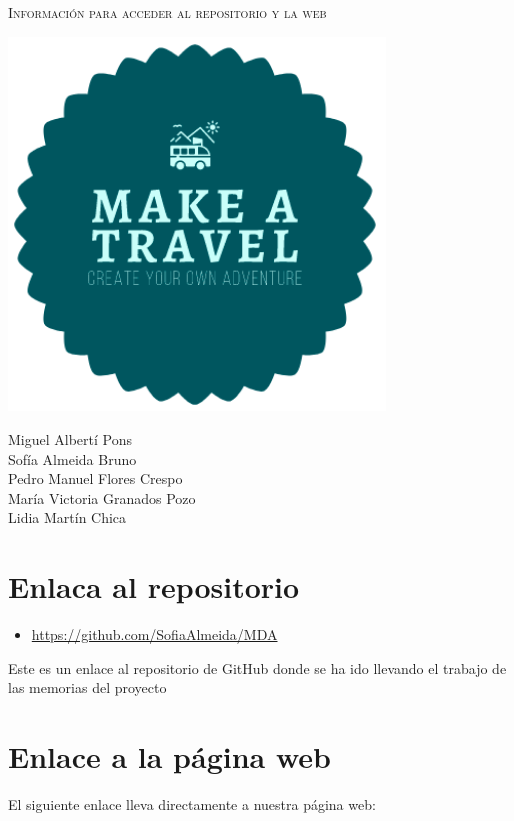 \documentclass[11pt]{article}
\begin{document}
\begin{titlepage}
\centering
\vspace{4.5cm}
{\scshape\LARGE Información para acceder al repositorio y la web \par}
\vspace{1.5cm}

\includegraphics[width=10cm]{Logo}

\vspace{3cm}
{\scshape\large \par}
\vspace{0.5cm}

{Miguel Albertí Pons\\
Sofía Almeida Bruno\\
Pedro Manuel Flores Crespo\\
María Victoria Granados Pozo\\
Lidia Martín Chica
\par}

\end{titlepage}
\newpage

\section{Enlaca al repositorio}
\begin{itemize}
\item \url{https://github.com/SofiaAlmeida/MDA} 
\end{itemize}

Este es un enlace al repositorio de GitHub donde se ha ido llevando el trabajo de las memorias del proyecto

\section{Enlace a la página web}
El siguiente enlace lleva directamente a nuestra página web: 
\end{document}
